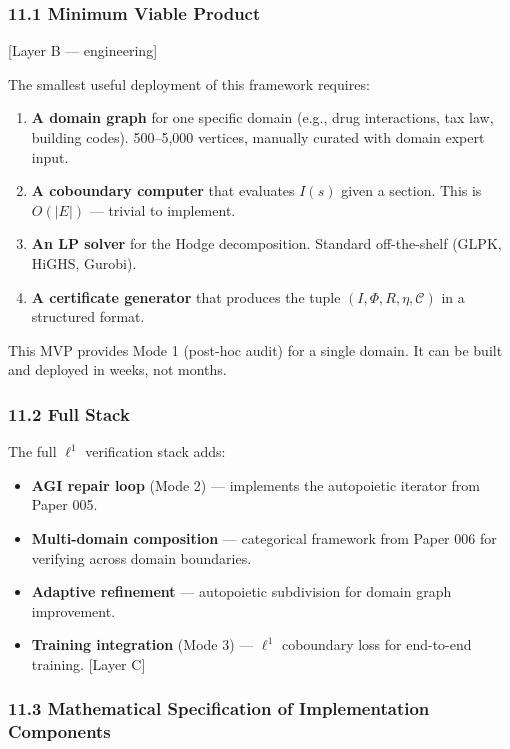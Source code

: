 \documentclass[
]{article}
\providecommand{\tightlist}{%
  \setlength{\itemsep}{0pt}\setlength{\parskip}{0pt}}
\begin{document}
\subsubsection{11.1 Minimum Viable
Product}\label{minimum-viable-product}

{[}Layer B --- engineering{]}

The smallest useful deployment of this framework requires:

\begin{enumerate}
\def\labelenumi{\arabic{enumi}.}
\tightlist
\item
  \textbf{A domain graph} for one specific domain (e.g., drug
  interactions, tax law, building codes). 500--5,000 vertices, manually
  curated with domain expert input.
\item
  \textbf{A coboundary computer} that evaluates \(I(s)\) given a
  section. This is \(O(|E|)\) --- trivial to implement.
\item
  \textbf{An LP solver} for the Hodge decomposition. Standard
  off-the-shelf (GLPK, HiGHS, Gurobi).
\item
  \textbf{A certificate generator} that produces the tuple
  \((I, \Phi, R, \eta, \mathcal{C})\) in a structured format.
\end{enumerate}

This MVP provides Mode 1 (post-hoc audit) for a single domain. It can be
built and deployed in weeks, not months.

\subsubsection{11.2 Full Stack}\label{full-stack}

The full \(\ell^1\) verification stack adds:

\begin{itemize}
\tightlist
\item
  \textbf{AGI repair loop} (Mode 2) --- implements the autopoietic
  iterator from Paper 005.
\item
  \textbf{Multi-domain composition} --- categorical framework from Paper
  006 for verifying across domain boundaries.
\item
  \textbf{Adaptive refinement} --- autopoietic subdivision for domain
  graph improvement.
\item
  \textbf{Training integration} (Mode 3) --- \(\ell^1\) coboundary loss
  for end-to-end training. {[}Layer C{]}
\end{itemize}

\subsubsection{11.3 Mathematical Specification of Implementation
Components}\label{mathematical-specification-of-implementation-components}
\end{document}
